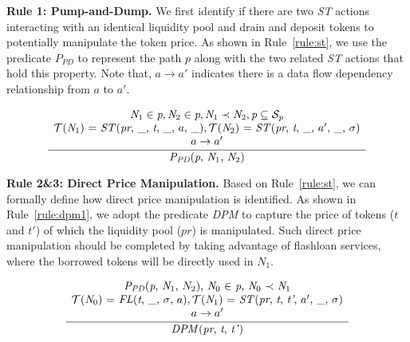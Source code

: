 \noindent
\textbf{Rule 1: Pump-and-Dump.}
We first identify if there are two \textit{ST} actions interacting with an identical liquidity pool and drain and deposit tokens to potentially manipulate the token price. 
As shown in Rule~\ref{rule:st}, we use the predicate $\textit{P}_{\textit{PD}}$ to represent the path $p$ along with the two related \textit{ST} actions that hold this property.
Note that, $a \rightarrow a'$ indicates there is a data flow dependency relationship from $a$ to $a'$.
\begin{small}
\begin{equation}
\label{rule:st}
\frac{
    \begin{array}{c}
    \textit{N}_{1} \in \textit{p}, \textit{N}_{2} \in \textit{p}, \textit{N}_{1} \prec \textit{N}_{2}, \textit{p} \subseteq \mathcal{S}_{\textit{p}} \\
    \text{$\mathcal{T}$($\textit{N}_{1}$) = \textit{ST}(\textit{pr}, \_, \textit{t}, \_, $a$, \_)}, \text{$\mathcal{T}$($\textit{N}_{2}$) = \textit{ST}(\textit{pr}, \textit{t}, \_, $a'$, \_, $\sigma$)} \\
    a \rightarrow a'
    \end{array}
}{
    \text{$\textit{P}_{\textit{PD}}$(\textit{p}, $\textit{N}_{1}$, $\textit{N}_{2}$)}
}
\end{equation}
\end{small}

\noindent
\textbf{Rule 2\&3: Direct Price Manipulation.}
Based on Rule~\ref{rule:st}, we can formally define how direct price manipulation is identified. As shown in Rule~\ref{rule:dpm1}, we adopt the predicate \textit{DPM} to capture the price of tokens ($t$ and $t'$) of which the liquidity pool ($pr$) is manipulated.
Such direct price manipulation should be completed by taking advantage of flashloan services, where the borrowed tokens will be directly used in $N_1$.

\begin{small}
\begin{equation}
\label{rule:dpm1}
\frac{
    \begin{array}{c}
    \text{$\textit{P}_{\textit{PD}}$(\textit{p}, $\textit{N}_{1}$, $N_2$), $\textit{N}_{0}$ $\in$ \textit{p}, $\textit{N}_{0}$ $\prec$ $\textit{N}_{1}$} \\
    \text{$\mathcal{T}$($\textit{N}_{0}$) = \textit{FL}(\textit{t}, \_, $\sigma$, $a$)}, \text{$\mathcal{T}$($\textit{N}_{1}$) = \textit{ST}(\textit{pr}, \textit{t}, \textit{t'}, $a'$, \_, $\sigma$)} \\
    a \rightarrow a'
    \end{array}
}{
    \text{\textit{DPM}(\textit{pr}, \textit{t}, \textit{t'})}
}
\end{equation}
\end{small}


